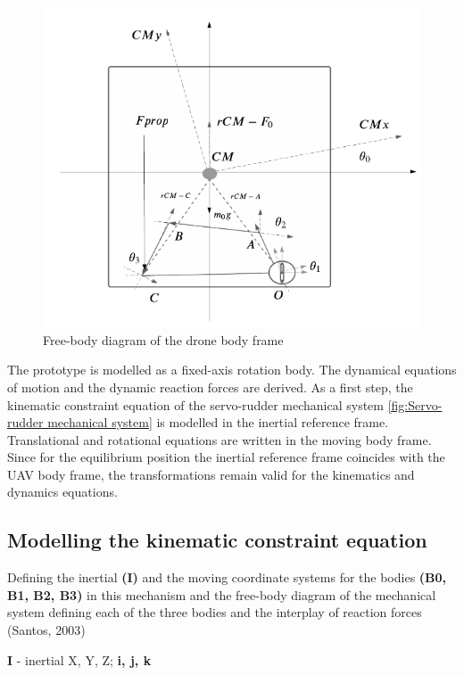 \begin{figure}[h!]
  \centering
  \includegraphics[scale=0.8]{graphics/DroneFBD.png}
  \caption{Free-body diagram of the drone body frame}
  \label{fig:Free-body diagram of the drone body frame}
\end{figure}

The prototype is modelled as a fixed-axis rotation body. The dynamical equations of motion and the dynamic reaction forces are derived. As a first step, the kinematic constraint equation of the servo-rudder mechanical system \ref{fig:Servo-rudder mechanical system} is modelled in the inertial reference frame. Translational and rotational equations are written in the moving body frame. Since for the equilibrium position the inertial reference frame coincides with the UAV body frame, the transformations remain valid for the kinematics and dynamics equations. 


\subsection{Modelling the kinematic constraint equation}

Defining the inertial\textbf{ (I) }and the moving coordinate systems for the bodies \textbf{(B0, B1, B2, B3) }in this mechanism and the free-body diagram of the mechanical system defining each of the three bodies and the interplay of reaction forces (Santos, 2003) \cite{santos2001dinamica}

\textbf{I} - inertial X, Y, Z;\textbf{ i, j, k}

